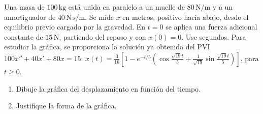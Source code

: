 Una masa de $100\,\mathrm{kg}$ está unida en paralelo a un muelle de $80\,\mathrm{N/m}$ y a un amortiguador de $40\,\mathrm{N\,s/m}$. Se mide $x$ en metros, positivo hacia abajo, desde el equilibrio previo cargado por la gravedad. En $t=0$ se aplica una fuerza adicional constante de $15\,\mathrm N$, partiendo del reposo y con $x(0)=0$. Use segundos. Para estudiar la gráfica, se proporciona la solución ya obtenida del PVI $100x''+40x'+80x=15$: $x(t)=\frac3{16}\left[1-e^{-t/5}\left(\cos\frac{\sqrt{19}t}{5}+\frac1{\sqrt{19}}\sin\frac{\sqrt{19}t}{5}\right)\right]$, para $t\ge0$.

\begin{enumerate}[label=(\alph*),ref=\alph*,leftmargin=*]
\item Dibuje la gráfica del desplazamiento en función del tiempo.
\item Justifique la forma de la gráfica.
\end{enumerate}
